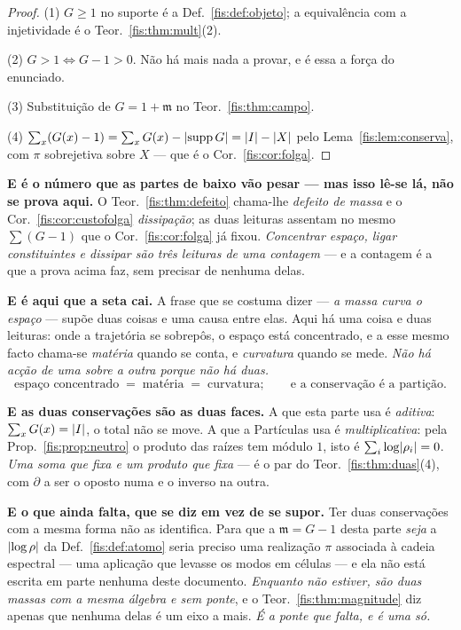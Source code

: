 \documentclass[livro.tex]{subfiles}
\begin{document}
\begin{proof}
(1) $G\ge1$ no suporte é a Def.~\ref{fis:def:objeto}; a equivalência com a
injetividade é o Teor.~\ref{fis:thm:mult}(2).

(2) $G>1\iff G-1>0$. Não há mais nada a provar, e é essa a força do enunciado.

(3) Substituição de $G=1+\mathfrak{m}$ no Teor.~\ref{fis:thm:campo}.

(4) $\sum_x(G(x)-1)=\sum_x G(x)-\lvert \operatorname{supp}G\rvert=\lvert I\rvert-\lvert X\rvert$ pelo
Lema~\ref{fis:lem:conserva}, com $\pi$ sobrejetiva sobre $X$ --- que é o
Cor.~\ref{fis:cor:folga}.

\end{proof}

\medskip\noindent\textbf{E é o número que as partes de baixo vão pesar --- mas
isso lê-se lá, não se prova aqui.} O Teor.~\ref{fis:thm:defeito} chama-lhe
\emph{defeito de massa} e o Cor.~\ref{fis:cor:custofolga} \emph{dissipação}; as
duas leituras assentam no mesmo $\sum(G-1)$ que o Cor.~\ref{fis:cor:folga} já
fixou. \emph{Concentrar espaço, ligar constituintes e dissipar são três leituras
de uma contagem} --- e a contagem é a que a prova acima faz, sem precisar de
nenhuma delas.

\medskip\noindent\textbf{E é aqui que a seta cai.} A frase que se costuma dizer
--- \emph{a massa curva o espaço} --- supõe duas coisas e uma causa entre elas.
Aqui há uma coisa e duas leituras: onde a trajetória se sobrepôs, o espaço está
concentrado, e a esse mesmo facto chama-se \emph{matéria} quando se conta, e
\emph{curvatura} quando se mede. \emph{Não há acção de uma sobre a outra porque
não há duas.}
\[
\boxed{\;\text{espaço concentrado}\;=\;\text{matéria}\;=\;\text{curvatura};\qquad
\text{e a conservação é a partição.}\;}
\]

\medskip\noindent\textbf{E as duas conservações são as duas faces.} A que esta
parte usa é \emph{aditiva}: $\sum_x G(x)=\lvert I\rvert$, o total não se move. A que a
Partículas usa é \emph{multiplicativa}: pela Prop.~\ref{fis:prop:neutro} o
produto das raízes tem módulo $1$, isto é $\sum_i\log\lvert \rho_i\rvert=0$. \emph{Uma
soma que fixa e um produto que fixa} --- é o par do Teor.~\ref{fis:thm:duas}(4),
com $\partial$ a ser o oposto numa e o inverso na outra.

\medskip\noindent\textbf{E o que ainda falta, que se diz em vez de se supor.} Ter
duas conservações com a mesma forma não as identifica. Para que a
$\mathfrak{m}=G-1$ desta parte \emph{seja} a $\lvert \log\rho\rvert$ da
Def.~\ref{fis:def:atomo} seria preciso uma realização $\pi$ associada à cadeia
espectral --- uma aplicação que levasse os modos em células --- e ela não está
escrita em parte nenhuma deste documento. \emph{Enquanto não estiver, são duas
massas com a mesma álgebra e sem ponte}, e o Teor.~\ref{fis:thm:magnitude} diz
apenas que nenhuma delas é um eixo a mais. \emph{É a ponte que falta, e é uma só.}
\end{document}
